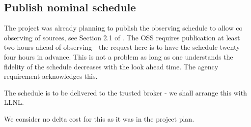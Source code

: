 \subsection{Publish nominal schedule} \label{sec:6publish}

The project was already planning to publish the observing schedule to allow co observing of sources, see Section 2.1 of .
The OSS requires  publication at least two  hours ahead of observing - the request here is to have the schedule twenty four hours in advance.
This is not a problem as long as one understands the fidelity of the schedule decreases with the look ahead time.
The agency requirement acknowledges this.

The schedule is to be delivered to the trusted broker - we shall arrange this with LLNL.

We consider no delta cost for this as it was in the project plan.

